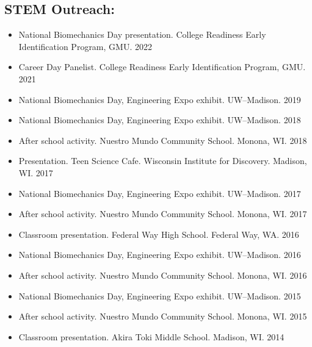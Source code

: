 \documentclass[letterpaper, 10pt]{article}
\begin{document}
\subsection{STEM Outreach:}
\begin{itemize}
    \item[] National Biomechanics Day presentation. College Readiness Early Identification Program, GMU. \hfill 2022 %
    \item[] Career Day Panelist. College Readiness Early Identification Program, GMU. \hfill 2021 %
    \item[] National Biomechanics Day, Engineering Expo exhibit. UW--Madison. \hfill 2019 %
    \item[] National Biomechanics Day, Engineering Expo exhibit. UW--Madison. \hfill 2018 %
    \item[] After school activity. Nuestro Mundo Community School. Monona, WI. \hfill 2018
    \item[] Presentation. Teen Science Cafe. Wisconsin Institute for Discovery. Madison, WI. \hfill 2017 %
    \item[] National Biomechanics Day, Engineering Expo exhibit. UW--Madison. \hfill 2017 %
    \item[] After school activity. Nuestro Mundo Community School. Monona, WI. \hfill 2017
    \item[] Classroom presentation. Federal Way High School. Federal Way, WA. \hfill 2016 %
    \item[] National Biomechanics Day, Engineering Expo exhibit. UW--Madison. \hfill 2016 %
    \item[] After school activity. Nuestro Mundo Community School. Monona, WI. \hfill 2016
    \item[] National Biomechanics Day, Engineering Expo exhibit. UW--Madison. \hfill 2015 %
    \item[] After school activity. Nuestro Mundo Community School. Monona, WI. \hfill 2015
    \item[] Classroom presentation. Akira Toki Middle School. Madison, WI. \hfill 2014 %
\end{itemize}
\end{document}
